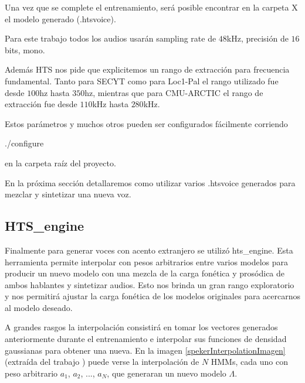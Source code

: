 Una vez que se complete el entrenamiento, será posible encontrar en la carpeta X el modelo generado (.htsvoice).

Para este trabajo todos los audios usarán sampling rate de $48$kHz, precisión de $16$bits, mono. 

Además HTS nos pide que explicitemos un rango de extracción para frecuencia fundamental. Tanto para SECYT como para Loc1-Pal el rango utilizado fue desde $100$hz hasta $350$hz, mientras que para CMU-ARCTIC el rango de extracción fue desde $110$kHz hasta $280$kHz.

Estos parámetros y muchos otros pueden ser configurados fácilmente corriendo

\begin{tcolorbox}
./configure
\end{tcolorbox}

en la carpeta raíz del proyecto.

En la próxima sección detallaremos como utilizar varios .htsvoice generados para mezclar y sintetizar una nueva voz.

\subsection{HTS\_engine} \label{interpolationTeory}

Finalmente para generar voces con acento extranjero se utilizó hts\_engine. Esta herramienta permite interpolar con pesos arbitrarios entre varios modelos para producir un nuevo modelo con una mezcla de la carga fonética y prosódica de ambos hablantes y sintetizar audios. Esto nos brinda un gran rango exploratorio y nos permitirá ajustar la carga fonética de los modelos originales para acercarnos al modelo deseado. 

A grandes rasgos la interpolación consistirá en tomar los vectores generados anteriormente durante el entrenamiento e interpolar sus funciones de densidad gaussianas para obtener una nueva. En la imagen \ref{spekerInterpolationImagen} (extraída del trabajo \cite{SpekerInterpolationRef}) puede verse la interpolación de $N$ HMMs, cada uno con peso arbitrario $a_1$, $a_2$, ..., $a_N$, que generaran un nuevo modelo $\Lambda$.

